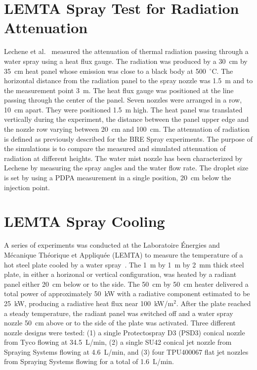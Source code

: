 \section{LEMTA Spray Test for Radiation Attenuation}
\label{LEMTA_Spray_Description}

Lechene et al.~\cite{Lechene} measured the attenuation of thermal radiation passing through a water spray using a heat flux gauge. The radiation was produced by a 30~cm by 35~cm heat panel whose emission was close to a black body at 500~$^\circ$C. The horizontal distance from the radiation panel to the spray nozzle was 1.5~m and to the measurement point 3~m. The heat flux gauge was positioned at the line passing through the center of the panel. Seven nozzles were arranged in a row, 10~cm apart. They were positioned 1.5~m high. The heat panel was translated vertically during the experiment, the distance between the panel upper edge and the nozzle row varying between 20~cm and 100~cm. The attenuation of radiation is defined as previously described for the BRE Spray experiments. The purpose of the simulations is to compare the measured and simulated attenuation of radiation at different heights. The water mist nozzle has been characterized by Lechene by measuring the spray angles and the water flow rate. The droplet size is set by using a PDPA measurement in a single position, 20~cm below the injection point.

\section{LEMTA Spray Cooling}
\label{LEMTA_Spray_Cooling_Description}

A series of experiments was conducted at the Laboratoire \'Energies and M\'ecanique Th\'eorique et Appliqu\'ee (LEMTA) to measure the temperature of a hot steel plate cooled by a water spray~\cite{Acem:ISFEH2022}. The 1~m by 1~m by 2~mm thick steel plate, in either a horizonal or vertical configuration, was heated by a radiant panel either 20~cm below or to the side. The 50~cm by 50~cm heater delivered a total power of approximately 50~kW with a radiative component estimated to be 25~kW, producing a radiative heat flux near 100~kW/m$^2$.  After the plate reached a steady temperature, the radiant panel was switched off and a water spray nozzle 50~cm above or to the side of the plate was activated. Three different nozzle designs were tested: (1) a single Protectospray D3 (PSD3) conical nozzle from Tyco flowing at 34.5~L/min, (2) a single SU42 conical jet nozzle from Spraying Systems flowing at 4.6~L/min, and (3) four TPU400067 flat jet nozzles from Spraying Systems flowing for a total of 1.6~L/min. 

